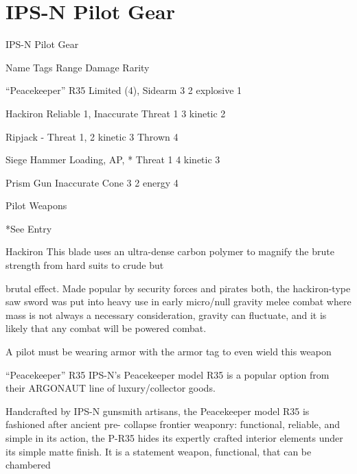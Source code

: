 \section{IPS-N Pilot Gear}

                                                IPS-N Pilot Gear

  Name                     Tags                                      Range            Damage                   Rarity

  “Peacekeeper” R35        Limited (4), Sidearm                      3                2 explosive              1

 Hackiron                  Reliable 1, Inaccurate                   Threat 1          3 kinetic                2

 Ripjack                   -                                        Threat 1,         2 kinetic                3
                                                                    Thrown 4

 Siege Hammer              Loading, AP, *                           Threat 1          4 kinetic                3

 Prism Gun                 Inaccurate                                Cone 3           2 energy                 4

                                                     Pilot Weapons

*See Entry


Hackiron
This blade uses an ultra-dense carbon polymer to magnify the brute strength from hard suits to crude but

brutal effect. Made popular by security forces and pirates both, the hackiron-type saw sword was put into
heavy use in early micro/null gravity melee combat where mass is not always a necessary consideration,
gravity can fluctuate, and it is likely that any combat will be powered combat.

A pilot must be wearing armor with the armor tag to even wield this weapon

“Peacekeeper” R35
IPS-N’s Peacekeeper model R35 is a popular option from their ARGONAUT line of luxury/collector goods.

Handcrafted by IPS-N gunsmith artisans, the Peacekeeper model R35 is fashioned after ancient pre-
collapse frontier weaponry: functional, reliable, and simple in its action, the P-R35 hides its expertly crafted
interior elements under its simple matte finish. It is a statement weapon, functional, that can be chambered

